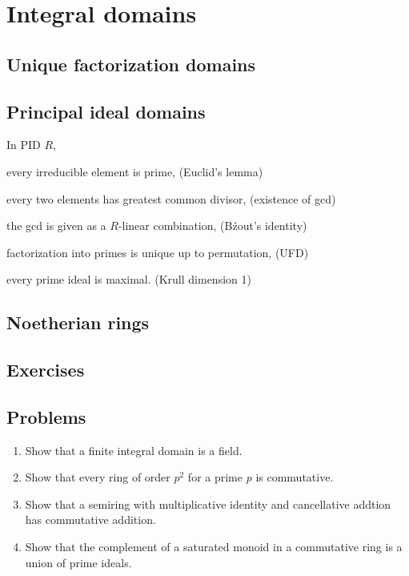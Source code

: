 \documentclass{../../large}
\begin{document}
\chapter{Integral domains}
\section{Unique factorization domains}
\section{Principal ideal domains}

\begin{prb}
In PID $R$,
\begin{parts}
\item every irreducible element is prime, \hfill(Euclid's lemma)
\item every two elements has greatest common divisor, \hfill(existence of gcd)
\item the gcd is given as a $R$-linear combination, \hfill(B\'zout's identity)
\item factorization into primes is unique up to permutation, \hfill(UFD)
\item every prime ideal is maximal. \hfill(Krull dimension 1)
\end{parts}
\end{prb}


\section{Noetherian rings}

\section*{Exercises}
\section*{Problems}
\begin{enumerate}
\item Show that a finite integral domain is a field.
\item Show that every ring of order $p^2$ for a prime $p$ is commutative.
\item Show that a semiring with multiplicative identity and cancellative addtion has commutative addition.
\item Show that the complement of a saturated monoid in a commutative ring is a union of prime ideals.
\end{enumerate}
\end{document}
